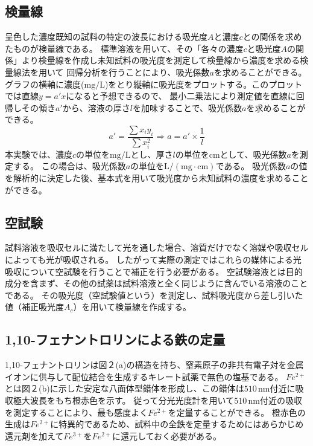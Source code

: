 \documentclass[11pt]{jsarticle}
\begin{document}
\subsection{検量線}
呈色した濃度既知の試料の特定の波長における吸光度$A$と濃度$c$との関係を求めたものが検量線である。
標準溶液を用いて、その「各々の濃度$c$と吸光度$A$の関係」より検量線を作成し未知試料の吸光度を測定して検量線から濃度を求める検量線法を用いて
回帰分析を行うことにより、吸光係数$a$を求めることができる。
グラフの横軸に濃度($\mathrm{mg/L}$)をとり縦軸に吸光度をプロットする。このプロットでは直線$y=a'x$になると予想できるので、
最小二乗法により測定値を直線に回帰しその傾き$a'$から、溶液の厚さ$l$を加味することで、吸光係数$a$を求めることができる。
\begin{equation}
    a'=\frac{\sum x_{i}y_{i}}{\sum x_{i}^{2}}
    \Rightarrow a=a' \times \frac{1}{l}
\end{equation}
本実験では、濃度$c$の単位を$\mathrm{mg/L}$とし、厚さ$l$の単位を$\mathrm{cm}$として、吸光係数$a$を測定する。
この場合は、吸光係数$a$の単位を$\mathrm{L/(mg \cdot cm)}$である。
吸光係数$a$の値を解析的に決定した後、基本式を用いて吸光度から未知試料の濃度を求めることができる。
\subsection{空試験}
試料溶液を吸収セルに満たして光を通した場合、溶質だけでなく溶媒や吸収セルによっても光が吸収される。
したがって実際の測定ではこれらの媒体による光吸収について空試験を行うことで補正を行う必要がある。
空試験溶液とは目的成分を含まず、その他の試薬は試料溶液と全く同じように含んでいる溶液のことである。
その吸光度（空試験値という）を測定し、試料吸光度から差し引いた値（補正吸光度$A_c$）を用いて検量線を作成する。
\subsection{1,10-フェナントロリンによる鉄の定量}
1,10-フェナントロリンは図２(a)の構造を持ち、窒素原子の非共有電子対を金属イオンに供与して配位結合を生成するキレート試薬で無色の塩基である。
$Fe^{2+}$とは図２(b)に示した安定な八面体型錯体を形成し、この錯体は$510\,\mathrm{nm}$付近に吸収極大波長をもち橙赤色を示す。
従って分光光度計を用いて$510\,\mathrm{nm}$付近の吸収を測定することにより、最も感度よく$Fe^{2+}$を定量することができる。
橙赤色の生成は$Fe^{2+}$に特異的であるため、試料中の全鉄を定量するためにはあらかじめ還元剤を加えて$Fe^{3+}$を$Fe^{2+}$に還元しておく必要がある。
\end{document}

